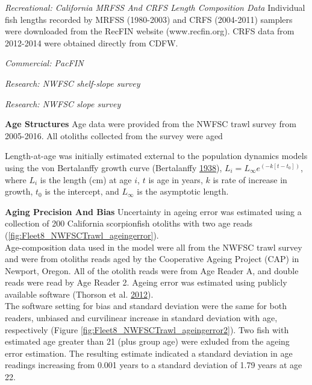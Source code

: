 \documentclass[12pt,]{article}
\begin{document}
\emph{Recreational: California MRFSS And CRFS Length Composition Data}
Individual fish lengths recorded by MRFSS (1980-2003) and CRFS
(2004-2011) samplers were downloaded from the RecFIN website
(www.recfin.org). CRFS data from 2012-2014 were obtained directly from
CDFW.

\emph{Commercial: PacFIN}

\emph{Research: NWFSC shelf-slope survey}

\emph{Research: NWFSC slope survey}

\vspace{.5cm}

\textbf{Age Structures} Age data were provided from the NWFSC trawl
survey from 2005-2016. All otoliths collected from the survey were aged

Length-at-age was initially estimated external to the population
dynamics models using the von Bertalanffy growth curve (Bertalanffy
\protect\hyperlink{ref-vonB1938}{1938}),
\(L_i = L_{\infty}e^{(-k[t-t_0])}\), where \(L_i\) is the length (cm) at
age \(i\), \(t\) is age in years, \(k\) is rate of increase in growth,
\(t_0\) is the intercept, and \(L_{\infty}\) is the asymptotic length.

\vspace{.5cm}

\textbf{Aging Precision And Bias} Uncertainty in ageing error was
estimated using a collection of 200 California scorpionfish otoliths
with two age reads (\ref{fig:Fleet8_NWFSCTrawl_ageingerror}).\\
Age-composition data used in the model were all from the NWFSC trawl
survey and were from otoliths reads aged by the Cooperative Ageing
Project (CAP) in Newport, Oregon. All of the otolith reads were from Age
Reader A, and double reads were read by Age Reader 2. Ageing error was
estimated using publicly available software (Thorson et al.
\protect\hyperlink{ref-Thorson2012}{2012}).\\
The software setting for bias and standard deviation were the same for
both readers, unbiased and curvilinear increase in standard deviation
with age, respectively (Figure
\ref{fig:Fleet8_NWFSCTrawl_ageingerror2}). Two fish with estimated age
greater than 21 (plus group age) were exluded from the ageing error
estimation. The resulting estimate indicated a standard deviation in age
readings increasing from 0.001 years to a standard deviation of 1.79
years at age 22.

\vspace{.5cm}
\end{document}
